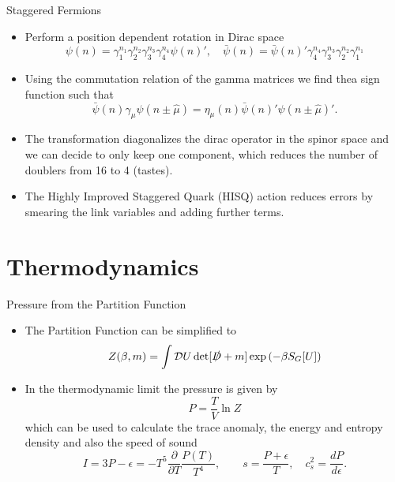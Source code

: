\documentclass[
	english, %
	design=2023, %
	]{tudabeamer}
\newcommand{\rbr}[1]{\left(#1\right)}
\begin{document}
\begin{frame}{Staggered Fermions}
    \begin{itemize}
        \item Perform a position dependent rotation in Dirac space
        \begin{equation}
        \psi(n)=\gamma_1^{n_1}\gamma_2^{n_2}\gamma_3^{n_3}\gamma_4^{n_4}\psi(n)', \quad \bar\psi(n)=\bar\psi(n)'\gamma_4^{n_4}\gamma_3^{n_3}\gamma_2^{n_2}\gamma_1^{n_1}
        \end{equation}
        \item Using the commutation relation of the gamma matrices we find thea sign function such that
        \begin{equation}
             \bar\psi(n)\gamma_\mu\psi(n\pm\hat\mu)= \eta_\mu(n)\bar\psi(n)'\psi(n\pm\hat\mu)'.
        \end{equation}
        \item The transformation diagonalizes the dirac operator in the spinor space and we can decide to only keep one component, which reduces the number of doublers from 16 to 4 (tastes).
        \item The Highly Improved Staggered Quark (HISQ) action reduces errors by smearing the link variables and adding further terms. 
    \end{itemize}
\end{frame}



\section{Thermodynamics}
\begin{frame}
    \sectionpage
\end{frame}
\begin{frame}{Pressure from the Partition Function}
    \begin{itemize}
        \item The Partition Function can be simplified to
        \begin{equation}
             Z(\beta,m)=\int \mathcal DU \det[\slashed D+m]\exp\rbr{-\beta S_G[U]}
        \end{equation}
        \item In the thermodynamic limit the pressure is given by
        \begin{equation}
            P=\frac{T}{V}\ln Z
        \end{equation}
        which can be used to calculate the trace anomaly, the energy and entropy density and also the speed of sound
        \begin{equation}
            I=3P-\epsilon=-T^5\frac{\partial}{\partial T}\frac{P(T)}{T^4},\qquad  s=\frac{P+\epsilon}{T},\quad c_s^2=\frac{dP}{d\epsilon}.
        \end{equation}
    \end{itemize}
\end{frame}
\end{document}
